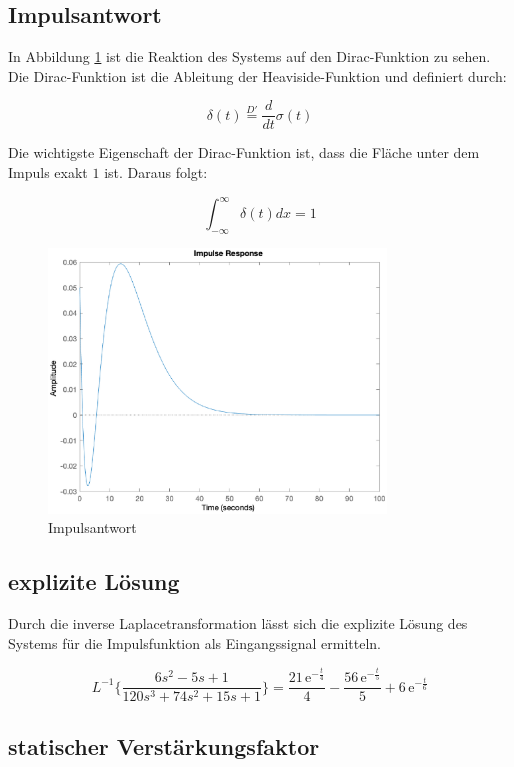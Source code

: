 \subsection{Impulsantwort}

In Abbildung \ref{fig:impuls} ist die Reaktion des Systems auf den Dirac-Funktion zu sehen. Die Dirac-Funktion ist die Ableitung der Heaviside-Funktion und definiert durch:

\[
    \delta (t) \stackrel{D'}{=} \frac{d}{dt} \sigma (t)
\]

Die wichtigste Eigenschaft der Dirac-Funktion ist, dass die Fläche unter dem Impuls exakt $1$ ist. Daraus folgt:

\[
    \int_{-\infty}^\infty \delta (t) dx = 1
\]

\begin{figure}[H]
    \label{fig:impuls}
    \centering
    \includegraphics[width=0.8\textwidth]{Bilder/ImpulsAntwort.eps}
    \caption{Impulsantwort}
\end{figure}

\subsection{explizite Lösung}

Durch die inverse Laplacetransformation lässt sich die explizite Lösung des Systems für die Impulsfunktion als Eingangssignal ermitteln.

\[
    L^{-1}\{\frac{6s^2 - 5s + 1}{120s^3 + 74s^2 + 15s +1}\} = \frac{21\,{\mathrm{e}}^{-\frac{t}{4}}}{4}-\frac{56\,{\mathrm{e}}^{-\frac{t}{5}}}{5}+6\,{\mathrm{e}}^{-\frac{t}{6}}
\]


\subsection{statischer Verstärkungsfaktor}

